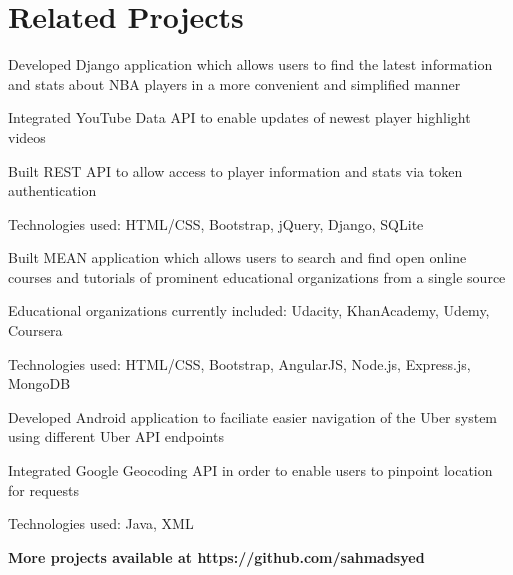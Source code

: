 \documentclass[letterpaper]{deedy-resume}
\begin{document}
\begin{minipage}[t]{0.66\textwidth}
\sectionspace

\section{Related Projects}

\location{}
\begin{tightitemize}
\item Developed Django application which allows users to find the latest information and stats about NBA players in a more convenient and simplified manner
\item Integrated YouTube Data API to enable updates of newest player highlight videos
\item Built REST API to allow access to player information and stats via token authentication
\item  Technologies used: HTML/CSS, Bootstrap, jQuery, Django, SQLite
\end{tightitemize}
\sectionspace


\location{}
\begin{tightitemize}
\item Built MEAN application which allows users to search and find open online courses and tutorials of prominent educational organizations from a single source
\item Educational organizations currently included: Udacity, KhanAcademy, Udemy, Coursera
\item Technologies used: HTML/CSS, Bootstrap, AngularJS, Node.js, Express.js, MongoDB
\end{tightitemize}
\sectionspace

\location{}
\begin{tightitemize}
\item Developed Android application to faciliate easier navigation of the Uber system using different Uber API endpoints 
\item Integrated Google Geocoding API in order to enable users to pinpoint location for requests
\item Technologies used: Java, XML
\end{tightitemize}
\sectionspace
\textbf{More projects available at https://github.com/sahmadsyed}


\end{minipage}
\end{document}
